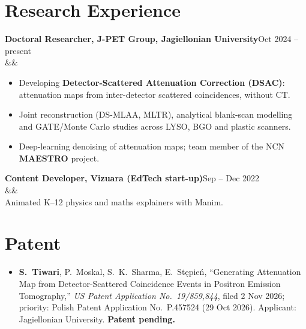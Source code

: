 \documentclass[10.5pt,a4paper]{article}
\newcommand{\me}{\textbf{S.~Tiwari}}
\newcommand{\entry}[4]{\noindent\textbf{#1}\hfill{\small\color{mute}#2}\\\ifx&#3&\else{\color{mute}\itshape #3}\\\fi #4\par\vspace{5pt}}
\begin{document}
\section{Research Experience}
\entry{Doctoral Researcher, J-PET Group, Jagiellonian University}{Oct 2024 -- present}{}{\vspace{-2pt}\begin{itemize}
\item Developing \textbf{Detector-Scattered Attenuation Correction (DSAC)}: attenuation maps from inter-detector scattered coincidences, without CT.
\item Joint reconstruction (DS-MLAA, MLTR), analytical blank-scan modelling and GATE/Monte Carlo studies across LYSO, BGO and plastic scanners.
\item Deep-learning denoising of attenuation maps; team member of the NCN \textbf{MAESTRO} project.
\end{itemize}}
\entry{Content Developer, Vizuara (EdTech start-up)}{Sep -- Dec 2022}{}{Animated K--12 physics and maths explainers with Manim.}

\section{Patent}
\begin{itemize}
\item \me, P.~Moskal, S.~K.~Sharma, E.~St{\k{e}}pie{\'n}, ``Generating Attenuation Map from Detector-Scattered Coincidence Events in Positron Emission Tomography,'' \emph{US Patent Application No.\ 19/859,844}, filed 2 Nov 2026; priority: Polish Patent Application No.\ P.457524 (29 Oct 2026). Applicant: Jagiellonian University. \textbf{Patent pending.}
\end{itemize}
\end{document}
